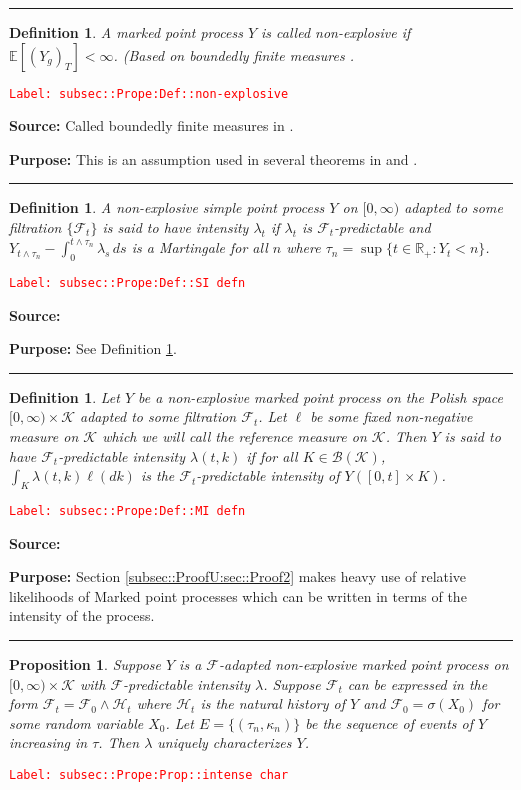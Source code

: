 \documentclass[12pt]{article}
\newcommand{\mb}{\mathbb}
\newcommand{\mc}{\mathcal}
\newcommand{\ms}{\mathscr}
\newcommand{\tr}{\textcolor{red}}
\newcommand{\labe}[1]{\tr{\texttt{Label: #1}}}
\newcommand{\purpose}{\textbf{Purpose: }}
\newcommand{\lin}{\rule{\linewidth}{0.4 pt}}
\newcommand{\ex}[1]{\mb{E}\left[#1\right]}			%
\newtheorem{prop}[thms]{Proposition}
\newtheorem{defn}[thms]{Definition}
\begin{document}
\lin

\begin{defn}
A marked point process \(Y\) is called non-explosive if \(\ex{(Y_g)_T} < \infty\). (Based on boundedly finite measures \cite[Definition 9.1.I]{DalVer08}.
\label{subsec::Prope:Def::non-explosive}
\end{defn}
\labe{subsec::Prope:Def::non-explosive}

\textbf{Source: } Called boundedly finite measures in \cite[Definition 9.1.I]{DalVer08}.

\purpose This is an assumption used in several theorems in \cite{DalVer03} and \cite{DalVer08}.

\lin

\begin{defn}
A non-explosive simple point process \(Y\) on \([0,\infty)\) adapted to some filtration \(\{\mc{F}_t\}\) is said to have intensity \(\lambda_t\) if \(\lambda_t\) is \(\mc{F}_t\)-predictable and \(Y_{t\wedge \tau_n} - \int_0^{t\wedge \tau_n} \lambda_s\,ds\) is a Martingale for all \(n\) where \(\tau_n = \sup\{t \in \mb{R}_+: Y_t < n\}\). 
\label{subsec::Prope:Def::SI defn}
\end{defn}
\labe{subsec::Prope:Def::SI defn}

\textbf{Source: } \cite[Definitions 14.3.I,14.1.I]{DalVer08}

\purpose See Definition \ref{subsec::Prope:Def::MI defn}.

\lin

\begin{defn}
Let \(Y\) be a non-explosive marked point process on the Polish space \([0,\infty)\times \mc{K}\) adapted to some filtration \(\mc{F}_t\). Let \(\ell\) be some fixed non-negative measure on \(\mc{K}\) which we will call the reference measure on \(\mc{K}\). Then \(Y\) is said to have \(\mc{F}_t\)-predictable intensity \(\lambda(t,k)\) if for all \(K \in \ms{B}(\mc{K})\), \(\int_K \lambda(t,k)\ell(dk)\) is the \(\mc{F}_t\)-predictable intensity of \(Y([0,t]\times K)\). 
\label{subsec::Prope:Def::MI defn}
\end{defn}
\labe{subsec::Prope:Def::MI defn}

\textbf{Source: }\cite[Definition 14.3.I]{DalVer08}

\purpose Section \ref{subsec::ProofU:sec::Proof2} makes heavy use of relative likelihoods of Marked point processes which can be written in terms of the intensity of the process.

\lin

\begin{prop}
Suppose \(Y\) is a \(\mc{F}\)-adapted non-explosive marked point process on \([0,\infty)\times \mc{K}\) with \(\mc{F}\)-predictable intensity \(\lambda\). Suppose \(\mc{F}_t\) can be expressed in the form \(\mc{F}_t = \mc{F}_0\wedge \mc{H}_t\) where \(\mc{H}_t\) is the natural history of \(Y\) and \(\mc{F}_0 = \sigma(X_0)\) for some random variable \(X_0\). Let \(E = \{(\tau_n,\kappa_n)\}\) be the sequence of events of \(Y\) increasing in \(\tau\). Then \(\lambda\) uniquely characterizes \(Y\).
\label{subsec::Prope:Prop::intense char}
\end{prop}
\labe{subsec::Prope:Prop::intense char}
\end{document}
